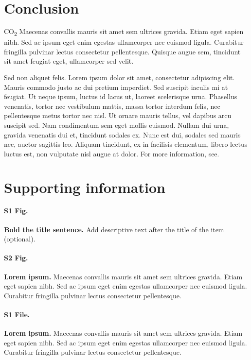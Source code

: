 \documentclass[10pt,letterpaper]{article}
\begin{document}
\section*{Conclusion}

CO\textsubscript{2} Maecenas convallis mauris sit amet sem ultrices gravida. Etiam eget sapien nibh. Sed ac ipsum eget enim egestas ullamcorper nec euismod ligula. Curabitur fringilla pulvinar lectus consectetur pellentesque. Quisque augue sem, tincidunt sit amet feugiat eget, ullamcorper sed velit. 

Sed non aliquet felis. Lorem ipsum dolor sit amet, consectetur adipiscing elit. Mauris commodo justo ac dui pretium imperdiet. Sed suscipit iaculis mi at feugiat. Ut neque ipsum, luctus id lacus ut, laoreet scelerisque urna. Phasellus venenatis, tortor nec vestibulum mattis, massa tortor interdum felis, nec pellentesque metus tortor nec nisl. Ut ornare mauris tellus, vel dapibus arcu suscipit sed. Nam condimentum sem eget mollis euismod. Nullam dui urna, gravida venenatis dui et, tincidunt sodales ex. Nunc est dui, sodales sed mauris nec, auctor sagittis leo. Aliquam tincidunt, ex in facilisis elementum, libero lectus luctus est, non vulputate nisl augue at dolor. For more information, see.

\section*{Supporting information}

\paragraph*{S1 Fig.}
\label{S1_Fig}
{\bf Bold the title sentence.} Add descriptive text after the title of the item (optional).

\paragraph*{S2 Fig.}
\label{S2_Fig}
{\bf Lorem ipsum.} Maecenas convallis mauris sit amet sem ultrices gravida. Etiam eget sapien nibh. Sed ac ipsum eget enim egestas ullamcorper nec euismod ligula. Curabitur fringilla pulvinar lectus consectetur pellentesque.

\paragraph*{S1 File.}
\label{S1_File}
{\bf Lorem ipsum.}  Maecenas convallis mauris sit amet sem ultrices gravida. Etiam eget sapien nibh. Sed ac ipsum eget enim egestas ullamcorper nec euismod ligula. Curabitur fringilla pulvinar lectus consectetur pellentesque.
\end{document}
